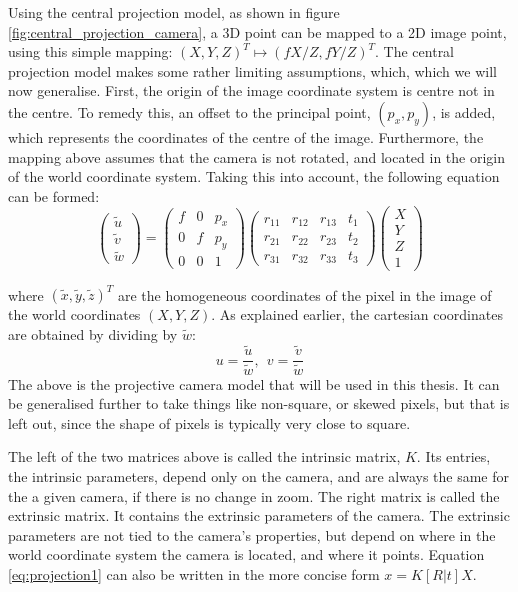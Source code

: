 Using the central projection model, as shown in figure \ref{fig:central_projection_camera}, a 3D point can be mapped to a 2D image point, using this simple mapping: $(X,Y,Z)^T\mapsto(fX/Z,fY/Z)^T$.
The central projection model makes some rather limiting assumptions, which, which we will now generalise.
First, the origin of the image coordinate system is centre not in the centre.
To remedy this, an offset to the principal point, $(p_{x}, p_{y})$, is added, which represents the coordinates of the centre of the image.
Furthermore, the mapping above assumes that the camera is not rotated, and located in the origin of the world coordinate system. Taking this into account, the following equation can be formed:
\begin{equation}\label{eq:projection1}
\begin{pmatrix}	\tilde{u}\\\tilde{v}\\\tilde{w}\end{pmatrix} = 
\begin{pmatrix}
	f & 0 & p_{x}\\
	0 & f & p_{y}\\
	0 & 0 & 1
\end{pmatrix}
\begin{pmatrix}
	r_{11} & r_{12} & r_{13} & t_{1}\\
	r_{21} & r_{22} & r_{23} & t_{2}\\
	r_{31} & r_{32} & r_{33} & t_{3}
\end{pmatrix}
\begin{pmatrix}	X\\Y\\Z\\1\end{pmatrix}
\end{equation}

where $(\tilde{x},\tilde{y},\tilde{z})^T$ are the homogeneous coordinates of the pixel in the image of the world coordinates $(X,Y,Z)$.
As explained earlier, the cartesian coordinates are obtained by dividing by $\tilde{w}$:
$$
u = \frac{\tilde{u}}{\tilde{w}},~~v = \frac{\tilde{v}}{\tilde{w}}
$$
The above is the projective camera model that will be used in this thesis. 
It can be generalised further to take things like non-square, or skewed pixels, but that is left out, since the shape of pixels is typically very close to square.

The left of the two matrices above is called the intrinsic matrix, $K$.
Its entries, the intrinsic parameters, depend only on the camera, and are always the same for the a given camera, if there is no change in zoom.
The right matrix is called the extrinsic matrix.
It contains the extrinsic parameters of the camera.
The extrinsic parameters are not tied to the camera's properties, but depend on where in the world coordinate system the camera is located, and where it points.
Equation \ref{eq:projection1} can also be written in the more concise form $x = K[R|t]X$.

